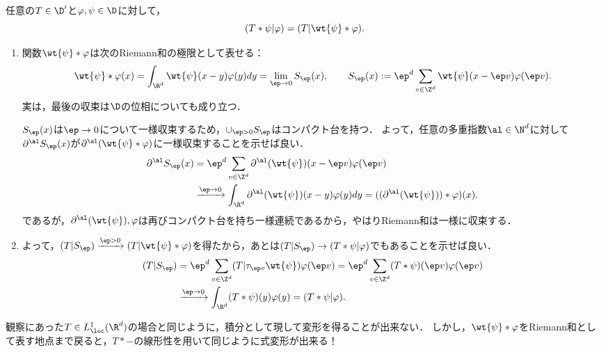 \documentclass[uplatex,dvipdfmx]{jsreport}
\begin{document}
\begin{proposition}[畳み込み作用素の随伴作用素]\label{prop-adjoint-of-convolution}
    任意の$T\in\D'$と$\varphi,\psi\in\D$に対して，
    \[(T*\psi|\varphi)=(T|\wt{\psi}*\varphi).\]
\end{proposition}
\begin{Proof}\mbox{}
    \begin{enumerate}[{Step}1]
        \item 関数$\wt{\psi}*\varphi$は次のRiemann和の極限として表せる：
        \[\wt{\psi}*\varphi(x)=\int_{\R^d}\wt{\psi}(x-y)\varphi(y)dy=\lim_{\ep\to0}S_\ep(x),\qquad S_\ep(x):=\ep^d\sum_{v\in\Z^d}\wt{\psi}(x-\ep v)\varphi(\ep v).\]
        実は，最後の収束は$\D$の位相についても成り立つ．

        $S_\ep(x)$は$\ep\to0$について一様収束するため，$\cup_{\ep>0}S_\ep$はコンパクト台を持つ．
        よって，任意の多重指数$\al\in\N^d$に対して$\partial^\al S_\ep(x)$が$\partial^\al(\wt{\psi}*\varphi)$に一様収束することを示せば良い．
        \begin{align*}
            \partial^\al S_\ep(x)&=\ep^d\sum_{v\in\Z^d}\partial^\al(\wt{\psi})(x-\ep v)\varphi(\ep v)\\
            &\xrightarrow{\ep\to0}\int_{\R^d}\partial^\al(\wt{\psi})(x-y)\varphi(y)dy=((\partial^\al(\wt{\psi}))*\varphi)(x).
        \end{align*}
        であるが，$\partial^\al(\wt{\psi}),\varphi$は再びコンパクト台を持ち一様連続であるから，やはりRiemann和は一様に収束する．
        \item よって，$(T|S_\ep)\xrightarrow{\ep>0}(T|\wt{\psi}*\varphi)$を得たから，あとは$(T|S_\ep)\to(T*\psi|\varphi)$でもあることを示せば良い．
        \begin{align*}
            (T|S_\ep)&=\ep^d\sum_{v\in\Z^d}(T|\tau_{\ep v}\wt{\psi})\varphi(\ep v)=\ep^d\sum_{v\in\Z^d}(T*\psi)(\ep v)\varphi(\ep v)\\
            &\xrightarrow{\ep\to0}\int_{\R^d}(T*\psi)(y)\varphi(y)=(T*\psi|\varphi).
        \end{align*}
    \end{enumerate}
\end{Proof}
\begin{remarks}[Riemann和としての表示に戻る]
    観察にあった$T\in L^1_\loc(\R^d)$の場合と同じように，積分として現して変形を得ることが出来ない．
    しかし，$\wt{\psi}*\varphi$をRiemann和として表す地点まで戻ると，$T*-$の線形性を用いて同じように式変形が出来る！
\end{remarks}
\end{document}
